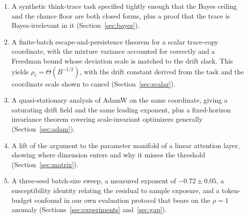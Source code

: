 \documentclass{article}
\theoremstyle{plain}
\theoremstyle{definition}
\theoremstyle{remark}
\newcommand{\1}{\mathbf{1}}
\begin{document}
\begin{enumerate}[leftmargin=*,itemsep=2pt]
\item A synthetic think-trace task specified tightly enough that the Bayes
ceiling and the chance floor are both closed forms, plus a proof that the trace
is Bayes-irrelevant in it (Section~\ref{sec:bayes}).
\item A finite-batch escape-and-persistence theorem for a scalar trace-copy
coordinate, with the mixture variance accounted for correctly and a Freedman
bound whose deviation scale is matched to the drift slack. This yields
$\rho_c=\Theta(B^{-1/2})$, with the drift constant derived from the task and the
coordinate scale shown to cancel (Section~\ref{sec:scalar}).
\item A quasi-stationary analysis of AdamW on the same coordinate, giving a
saturating drift field and the same leading exponent, plus a fixed-horizon
invariance theorem covering scale-invariant optimizers generally
(Section~\ref{sec:adam}).
\item A lift of the argument to the parameter manifold of a linear attention
layer, showing where dimension enters and why it misses the threshold
(Section~\ref{sec:matrix}).
\item A three-seed batch-size sweep, a measured exponent of $-0.72\pm0.05$, a
susceptibility identity relating the residual to sample exposure, and a
token-budget confound in our own evaluation protocol that bears on the $\rho=1$
anomaly (Sections~\ref{sec:experiments} and~\ref{sec:gap}).
\end{enumerate}
\end{document}
